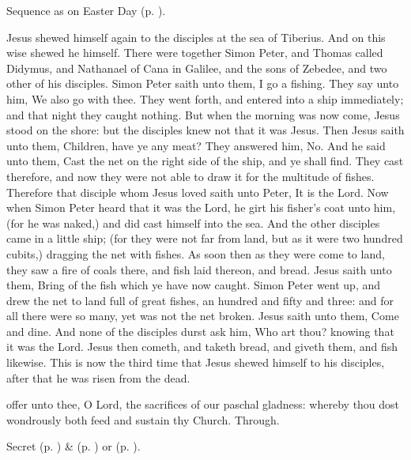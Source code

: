 \begin{rubric}
    Sequence as on Easter Day (p. \pageref{PaschalSequence}).
\end{rubric}

 Jesus shewed himself again to the disciples at the sea of Tiberius. And on this wise shewed he himself. There were together Simon Peter, and Thomas called Didymus, and Nathanael of Cana in Galilee, and the sons of Zebedee, and two other of his disciples. Simon Peter saith unto them, I go a fishing. They say unto him, We also go with thee. They went forth, and entered into a ship immediately; and that night they caught nothing. But when the morning was now come, Jesus stood on the shore: but the disciples knew not that it was Jesus. Then Jesus saith unto them, Children, have ye any meat? They answered him, No. And he said unto them, Cast the net on the right side of the ship, and ye shall find. They cast therefore, and now they were not able to draw it for the multitude of fishes. Therefore that disciple whom Jesus loved saith unto Peter, It is the Lord. Now when Simon Peter heard that it was the Lord, he girt his fisher's coat unto him, (for he was naked,) and did cast himself into the sea. And the other disciples came in a little ship; (for they were not far from land, but as it were two hundred cubits,) dragging the net with fishes. As soon then as they were come to land, they saw a fire of coals there, and fish laid thereon, and bread. Jesus saith unto them, Bring of the fish which ye have now caught. Simon Peter went up, and drew the net to land full of great fishes, an hundred and fifty and three: and for all there were so many, yet was not the net broken. Jesus saith unto them, Come and dine. And none of the disciples durst ask him, Who art thou? knowing that it was the Lord. Jesus then cometh, and taketh bread, and giveth them, and fish likewise. This is now the third time that Jesus shewed himself to his disciples, after that he was risen from the dead.


\secret
{} offer unto thee, O Lord, the sacrifices of our paschal gladness: whereby thou dost wondrously both feed and sustain thy Church. Through.


\begin{rubric}
     Secret  (p. \pageref{EasterSecret}) \&   (p. \pageref{SPAgainst}) or  (p. \pageref{SPChiefBishop}).
\end{rubric}

